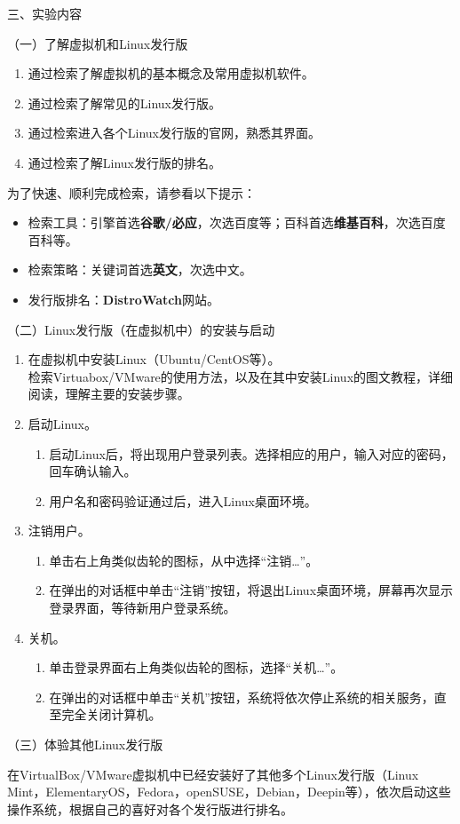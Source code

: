 \vspace{0.2in}
\noindent
三、实验内容

\vspace{0.1in}
（一）了解虚拟机和Linux发行版
\begin{enumerate}
  \item 通过检索了解虚拟机的基本概念及常用虚拟机软件。
  \item 通过检索了解常见的Linux发行版。
  \item 通过检索进入各个Linux发行版的官网，熟悉其界面。
  \item 通过检索了解Linux发行版的排名。
\end{enumerate}

为了快速、顺利完成检索，请参看以下提示：
\begin{itemize}
  \item 检索工具：引擎首选\textbf{谷歌/必应}，次选百度等；百科首选\textbf{维基百科}，次选百度百科等。
  \item 检索策略：关键词首选\textbf{英文}，次选中文。
  \item 发行版排名：\textbf{DistroWatch}网站。
\end{itemize}

\vspace{0.1in}
（二）Linux发行版（在虚拟机中）的安装与启动
\begin{enumerate}
  \item 在虚拟机中安装Linux（Ubuntu/CentOS等）。
\\ 检索Virtuabox/VMware的使用方法，以及在其中安装Linux的图文教程，详细阅读，理解主要的安装步骤。
  \item 启动Linux。
    \begin{enumerate}
      \item 启动Linux后，将出现用户登录列表。选择相应的用户，输入对应的密码，回车确认输入。
      \item 用户名和密码验证通过后，进入Linux桌面环境。
    \end{enumerate}
  \item 注销用户。
    \begin{enumerate}
      \item 单击右上角类似齿轮的图标，从中选择“注销…”。
      \item 在弹出的对话框中单击“注销”按钮，将退出Linux桌面环境，屏幕再次显示登录界面，等待新用户登录系统。
    \end{enumerate}
  \item 关机。
    \begin{enumerate}
      \item 单击登录界面右上角类似齿轮的图标，选择“关机…”。
      \item 在弹出的对话框中单击“关机”按钮，系统将依次停止系统的相关服务，直至完全关闭计算机。
    \end{enumerate}
\end{enumerate}

\vspace{0.1in}
（三）体验其他Linux发行版

在VirtualBox/VMware虚拟机中已经安装好了其他多个Linux发行版（Linux Mint，ElementaryOS，Fedora，openSUSE，Debian，Deepin等），依次启动这些操作系统，根据自己的喜好对各个发行版进行排名。

